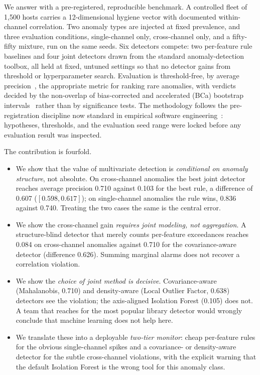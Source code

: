 \documentclass[journal]{IEEEtran}
\begin{document}
We answer with a pre-registered, reproducible benchmark. A controlled fleet of 1{,}500 hosts carries a
12-dimensional hygiene vector with documented within-channel correlation. Two anomaly types are
injected at fixed prevalence, and three evaluation conditions, single-channel only, cross-channel
only, and a fifty-fifty mixture, run on the same seeds. Six detectors compete: two per-feature rule
baselines and four joint detectors drawn from the standard anomaly-detection toolbox, all held at
fixed, untuned settings so that no detector gains from threshold or hyperparameter search.
Evaluation is threshold-free, by average precision~\cite{davis2006pr}, the appropriate metric for
ranking rare anomalies, with verdicts decided by the non-overlap of bias-corrected and accelerated
(BCa) bootstrap intervals~\cite{efron1987bca,efron1994introduction} rather than by significance
tests. The methodology follows the pre-registration discipline now standard in empirical software
engineering~\cite{wohlin2012experimentation}: hypotheses, thresholds, and the evaluation seed range
were locked before any evaluation result was inspected.

The contribution is fourfold.
\begin{itemize}
\item We show that the value of multivariate detection is \emph{conditional on anomaly structure},
not absolute. On cross-channel anomalies the best joint detector reaches average precision 0.710
against 0.103 for the best rule, a difference of 0.607 ($[0.598, 0.617]$); on single-channel
anomalies the rule wins, 0.836 against 0.740. Treating the two cases the same is the central error.
\item We show the cross-channel gain \emph{requires joint modeling, not aggregation}. A
structure-blind detector that merely counts per-feature exceedances reaches 0.084 on cross-channel
anomalies against 0.710 for the covariance-aware detector (difference 0.626). Summing marginal
alarms does not recover a correlation violation.
\item We show the \emph{choice of joint method is decisive}. Covariance-aware (Mahalanobis, 0.710)
and density-aware (Local Outlier Factor, 0.638) detectors see the violation; the axis-aligned
Isolation Forest (0.105) does not. A team that reaches for the most popular library detector would
wrongly conclude that machine learning does not help here.
\item We translate these into a deployable \emph{two-tier monitor}: cheap per-feature rules for the
obvious single-channel spikes and a covariance- or density-aware detector for the subtle
cross-channel violations, with the explicit warning that the default Isolation Forest is the wrong
tool for this anomaly class.
\end{itemize}
\end{document}
